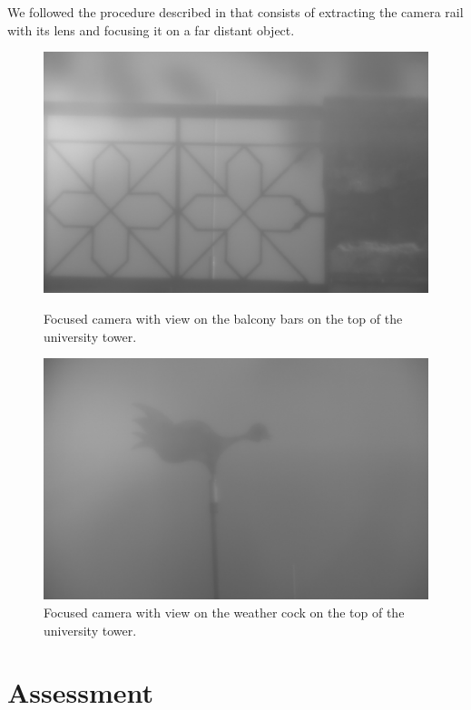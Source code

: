 We followed the procedure described in \cite{Hertlein2017} that consists of
extracting the camera rail with its lens and focusing it on a far distant
object.

\begin{figure}[ht]
  \centering
  \includegraphics[width=\linewidth]{images/focus/focus2.jpg}
    \caption{Focused camera with view on the balcony bars on the top of the
    university tower.}
    \label{fig:camerafocus:balcony}
  \endminipage
  \hfill
    \includegraphics[width=\linewidth]{images/focus/focus3.jpg}
    \caption{Focused camera with view on the weather cock on the top of the
    university tower.}
    \label{fig:camerafocus:cock}
  \endminipage
  \hfill
\end{figure}

\section{Assessment}


